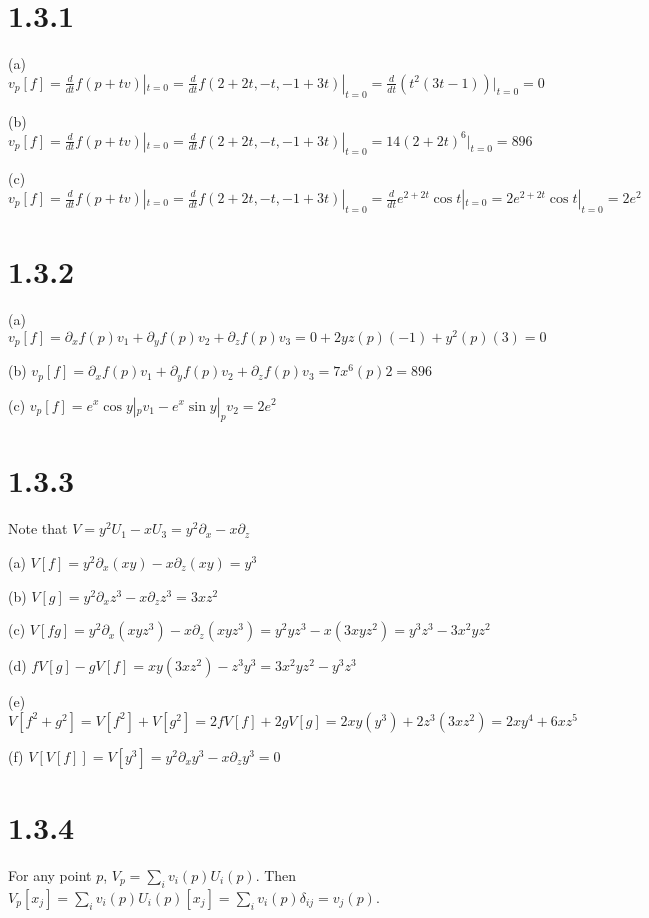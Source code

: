 \documentclass[12pt]{article}
\begin{document}
\QED

\section*{1.3.1}
(a) $v_p[f] = \frac{d}{dt}f(p + tv) |_{t=0} = \frac{d}{dt}f(2+2t, -t, -1+3t) |_{t=0} = \frac{d}{dt}(t^2(3t-1)) |_{t=0} = 0$

(b) $v_p[f] = \frac{d}{dt}f(p+tv)|_{t=0} =  \frac{d}{dt}f(2+2t, -t, -1+3t) |_{t=0} = 14(2+2t)^6 |_{t=0} = 896$

(c) $v_p[f] = \frac{d}{dt}f(p+tv)|_{t=0} =  \frac{d}{dt}f(2+2t, -t, -1+3t) |_{t=0} = \frac{d}{dt} e^{2+2t}\cos t |_{t=0} = 2e^{2+2t}\cos t |_{t=0} = 2e^2$


\section*{1.3.2}
(a) $v_p[f] = \partial_x f (p) v_1 + \partial_y f (p) v_2 + \partial_z f (p) v_3 = 0 + 2yz(p) (-1) + y^2(p) (3) = 0$

(b) $v_p[f] = \partial_x f (p) v_1 + \partial_y f (p) v_2 + \partial_z f (p) v_3 = 7x^6(p) 2 = 896$

(c) $v_p[f] = e^x\cos y |_p v_1 - e^x \sin y |_p v_2 = 2e^2$

\section*{1.3.3}
Note that $V = y^2U_1 - xU_3 = y^2 \partial_x - x \partial_z $

(a) $V[f] = y^2 \partial_x (xy) - x \partial_z (xy) = y^3$

(b) $V[g] = y^2 \partial_x z^3 - x \partial_z z^3 = 3xz^2$

(c) $V[fg] =  y^2 \partial_x (xyz^3) - x \partial_z (xyz^3) = y^2 y z^3 - x(3xyz^2) = y^3z^3 - 3x^2yz^2$

(d) $fV[g] - gV[f] = xy(3xz^2) - z^3 y^3 = 3x^2yz^2 - y^3z^3$

(e) $V[f^2 + g^2] = V[f^2] + V[g^2] = 2f V[f] + 2g V[g] = 2xy (y^3) + 2z^3 (3xz^2) = 2xy^4 + 6xz^5$

(f) $V[V[f]] = V[y^3] = y^2 \partial_x y^3 - x \partial_z y^3 = 0$

\section*{1.3.4}
For any point $p$, $V_p = \sum_i v_i(p)U_i(p)$. Then $V_p[x_j] = \sum_i v_i(p) U_i(p)[x_j] = \sum_i v_i(p) \delta_{ij} = v_j(p)$. \QED
\end{document}
